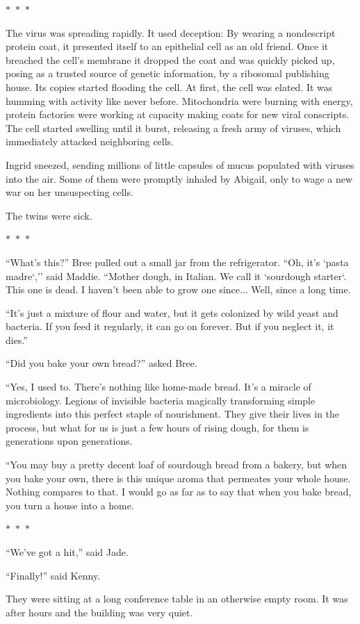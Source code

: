 \documentclass{memoir}
\newcommand{\starbreak}{%
\begin{center}
  $\ast$~$\ast$~$\ast$
\end{center}
}
\begin{document}
\starbreak

The virus was spreading rapidly. It used deception: By wearing a nondescript protein coat, it presented itself to an epithelial cell as an old friend. Once it breached the cell's membrane it dropped the coat and was quickly picked up, posing as a trusted source of genetic information, by a ribosomal publishing house. Its copies started flooding the cell. At first, the cell was elated. It was humming with activity like never before. Mitochondria were burning with energy, protein factories were working at capacity making coats for new viral conscripts. The cell started swelling until it burst, releasing a fresh army of viruses, which immediately attacked neighboring cells. 

Ingrid sneezed, sending millions of little capsules of mucus populated with viruses into the air. Some of them were promptly inhaled by Abigail, only to wage a new war on her unsuspecting cells. 

The twins were sick.

\starbreak

``What's this?'' Bree pulled out a small jar from the refrigerator.
``Oh, it's `pasta madre`,'' said Maddie. ``Mother dough, in Italian. We call it `sourdough starter`. This one is dead. I haven't been able to grow one since... Well, since a long time.

``It's just a mixture of flour and water, but it gets colonized by wild yeast and bacteria. If you feed it regularly, it can go on forever. But if you neglect it, it dies.''

``Did you bake your own bread?'' asked Bree.

``Yes, I used to. There's nothing like home-made bread. It's a miracle of microbiology. Legions of invisible bacteria magically transforming simple ingredients into this perfect staple of nourishment. They give their lives in the process, but what for us is just a few hours of rising dough, for them is generations upon generations.

``You may buy a pretty decent loaf of sourdough bread from a bakery, but when you bake your own, there is this unique aroma that permeates your whole house. Nothing compares to that. I would go as far as to say that when you bake bread, you turn a house into a home. 

\starbreak

``We've got a hit,'' said Jade. 

``Finally!'' said Kenny. 

They were sitting at a long conference table in an otherwise empty room. It was after hours and the building was very quiet. 
\end{document}
